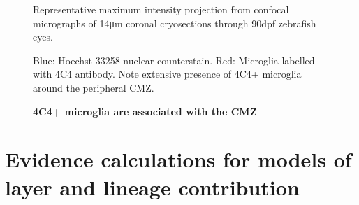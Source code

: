 \begin{figure}[!h]
    \caption{{\bf 4C4+ microglia are associated with the CMZ}}
    Representative maximum intensity projection from confocal micrographs of 14\si{\micro\metre} coronal cryosections through 90dpf zebrafish eyes.
    
    Blue: Hoechst 33258 nuclear counterstain. Red: Microglia labelled with 4C4 antibody. Note extensive presence of 4C4+ microglia around the peripheral CMZ.
    \label{4C4micrograph}
\end{figure}



\FloatBarrier

\section{Evidence calculations for models of layer and lineage contribution}
\FloatBarrier


